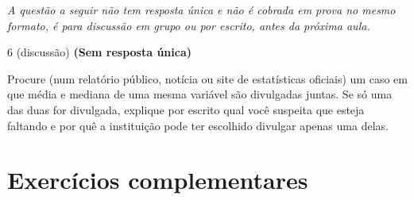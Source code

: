 \documentclass[11pt]{article}
\begin{document}
\bigskip
\noindent\textit{A questão a seguir não tem resposta única e não é cobrada em prova no mesmo
formato, é para discussão em grupo ou por escrito, antes da próxima aula.}

\begin{questao}{6 (discussão)} \textbf{(Sem resposta única)}

Procure (num relatório público, notícia ou site de estatísticas oficiais) um caso em que média e
mediana de uma mesma variável são divulgadas juntas. Se só uma das duas for divulgada, explique por
escrito qual você suspeita que esteja faltando e por quê a instituição pode ter escolhido divulgar
apenas uma delas.
\end{questao}


\bigskip
\section*{Exercícios complementares}
\end{document}
